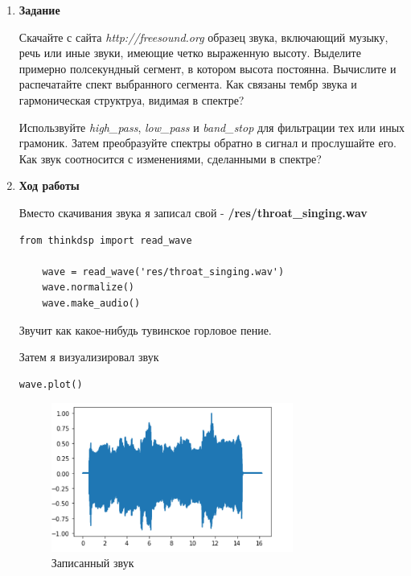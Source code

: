 \documentclass[a4paper,12pt]{article}
\begin{document}
\begin{enumerate}
	

\item \textbf{Задание}

	Скачайте с сайта \textit{http://freesound.org} образец звука, включающий музыку, речь или иные звуки, имеющие четко выраженную высоту. Выделите примерно полсекундный сегмент, в котором высота постоянна. Вычислите и распечатайте спект выбранного сегмента. Как связаны тембр звука и гармоническая структруа, видимая в спектре?
		
	Использвуйте \textit{high\_pass}, \textit{low\_pass} и \textit{band\_stop} для фильтрации тех или иных грамоник. Затем преобразуйте спектры обратно в сигнал и прослушайте его. Как звук соотносится с изменениями, сделанными в спектре?

\item \textbf{Ход работы}

Вместо скачивания звука я записал свой - \textbf{/res/throat\_singing.wav}

\begin{lstlisting}[caption=Загрузка и прослушивание звука]
	from thinkdsp import read_wave
	
	wave = read_wave('res/throat_singing.wav')
	wave.normalize()
	wave.make_audio()
\end{lstlisting}

Звучит как какое-нибудь тувинское горловое пение.

Затем я визуализировал звук

\begin{lstlisting}[caption=Визуализация звука]
	wave.plot()
\end{lstlisting}

\begin{figure}[H]
	\centering
	\includegraphics[width=0.75\textwidth]{2_1.png}
	\caption{Записанный звук}
	\label{fig:2.1}
\end{figure}


\end{enumerate}
\end{document}
